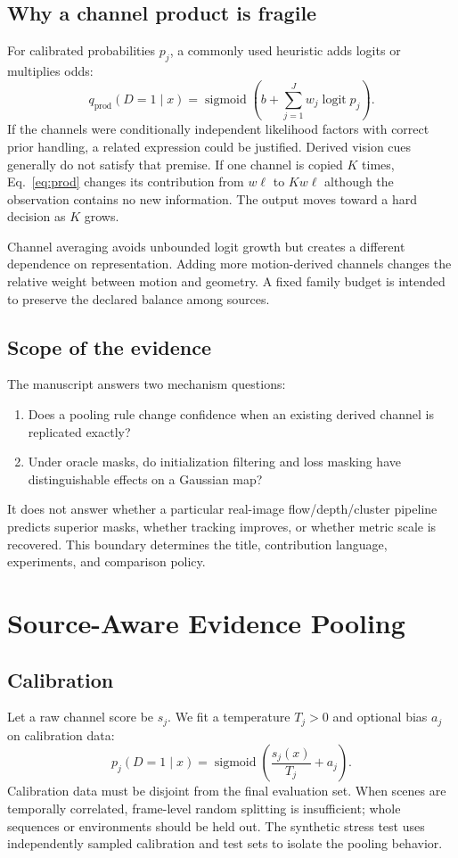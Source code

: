 \documentclass[10pt,conference]{IEEEtran}
\newcommand{\logit}{\operatorname{logit}}
\newcommand{\sigmoid}{\operatorname{sigmoid}}
\begin{document}
\subsection{Why a channel product is fragile}
For calibrated probabilities $p_j$, a commonly used heuristic adds logits or multiplies odds:
\begin{equation}
q_{\mathrm{prod}}(D=1\mid x)=\sigmoid\!\left(b+\sum_{j=1}^{J}w_j\logit p_j\right).
\label{eq:prod}
\end{equation}
If the channels were conditionally independent likelihood factors with correct prior handling, a related expression could be justified. Derived vision cues generally do not satisfy that premise. If one channel is copied $K$ times, Eq.~\eqref{eq:prod} changes its contribution from $w\ell$ to $Kw\ell$ although the observation contains no new information. The output moves toward a hard decision as $K$ grows.

Channel averaging avoids unbounded logit growth but creates a different dependence on representation. Adding more motion-derived channels changes the relative weight between motion and geometry. A fixed family budget is intended to preserve the declared balance among sources.

\subsection{Scope of the evidence}
The manuscript answers two mechanism questions:
\begin{enumerate}
\item Does a pooling rule change confidence when an existing derived channel is replicated exactly?
\item Under oracle masks, do initialization filtering and loss masking have distinguishable effects on a Gaussian map?
\end{enumerate}
It does not answer whether a particular real-image flow/depth/cluster pipeline predicts superior masks, whether tracking improves, or whether metric scale is recovered. This boundary determines the title, contribution language, experiments, and comparison policy.

\section{Source-Aware Evidence Pooling}
\subsection{Calibration}
Let a raw channel score be $s_j$. We fit a temperature $T_j>0$ and optional bias $a_j$ on calibration data:
\begin{equation}
p_j(D=1\mid x)=\sigmoid\left(\frac{s_j(x)}{T_j}+a_j\right).
\label{eq:temp}
\end{equation}
Calibration data must be disjoint from the final evaluation set. When scenes are temporally correlated, frame-level random splitting is insufficient; whole sequences or environments should be held out. The synthetic stress test uses independently sampled calibration and test sets to isolate the pooling behavior.
\end{document}
